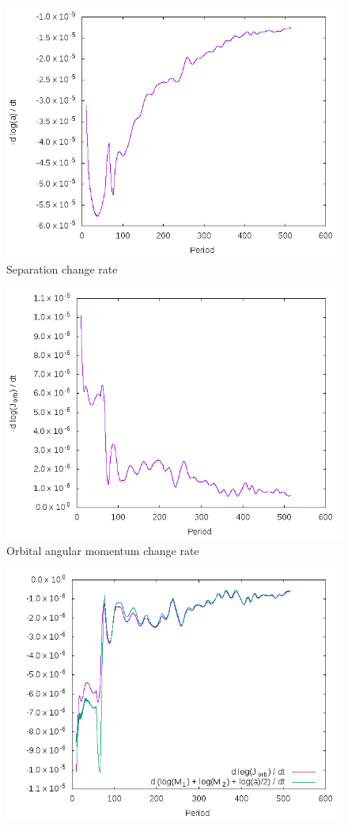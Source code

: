 \documentclass[preprint]{aastex}
\begin{document}
\begin{figure}
\includegraphics{./images/adot.png}
\caption{Separation change rate}
\label{adot_fig}
\end{figure}

\begin{figure}
\includegraphics{./images/jdot.png}
\caption{Orbital angular momentum change rate}
\label{jdot_fig}
\end{figure}


\begin{figure}
\includegraphics{./images/jorb.png}
\caption{}
\label{jdot_fig2}
\end{figure}


\end{document}

